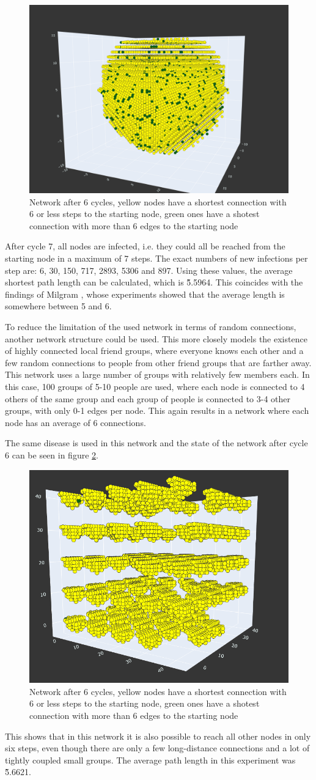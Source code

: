 \begin{figure}
    \centering
    \includegraphics[width=0.5\linewidth]{images/small_world_network.png}
    \caption{Network after 6 cycles, yellow nodes have a shortest connection with 6 or less steps to the starting node,
    green ones have a shotest connection with more than 6 edges to the starting node}
    \label{fig:small_world_network}
\end{figure}

After cycle 7, all nodes are infected, i.e. they could all be reached from the starting node in a maximum of 7 steps. The exact numbers of new infections per step are: 6, 30, 150, 717, 2893, 5306 and 897. Using these values, the average shortest path length can be calculated, which is \~5.5964. This coincides with the findings of Milgram \cite{smallWorld}, whose experiments showed that the average length is somewhere between 5 and 6.

To reduce the limitation of the used network in terms of random connections, another network structure could be used. This more closely models the existence of highly connected local friend groups, where everyone knows each other and a few random connections to people from other friend groups that are farther away. This network uses a large number of groups with relatively few members each. In this case, 100 groups of 5-10 people are used, where each node is connected to 4 others of the same group and each group of people is connected to 3-4 other groups, with only 0-1 edges per node. This again results in a network where each node has an average of 6 connections.

The same disease is used in this network and the state of the network after cycle 6 can be seen in figure \ref{fig:small_world_groups}.

\begin{figure}
    \centering
    \includegraphics[width=0.5\linewidth]{images/small_world_groups.png}
    \caption{Network after 6 cycles, yellow nodes have a shortest connection with 6 or less steps to the starting node,
    green ones have a shotest connection with more than 6 edges to the starting node}
    \label{fig:small_world_groups}
\end{figure}

This shows that in this network it is also possible to reach all other nodes in only six steps, even though there are only a few long-distance connections and a lot of tightly coupled small groups. The average path length in this experiment was \~5.6621.


